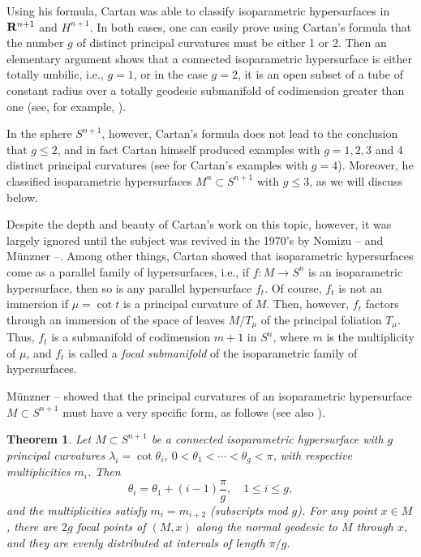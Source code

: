 \documentclass[12pt]{article}
\newtheorem{theorem}{Theorem}[section]
\begin{document}
Using his formula, Cartan was able to classify isoparametric hypersurfaces in ${\bf R}^{n+1}$ and $H^{n+1}$.  In both cases, one can easily prove using Cartan's formula that the number $g$ of distinct principal curvatures must be either 1 or 2.   Then an elementary argument shows that a connected isoparametric hypersurface is either totally umbilic, i.e., $g=1$, or in the case $g=2$,
it is an open subset of a tube of constant radius over a totally geodesic submanifold of codimension greater than one (see, for example, \cite[pp. 96--98]{CR8}).


In the sphere $S^{n+1}$, however, Cartan's formula does not lead to the conclusion that $g \leq 2$, and in fact Cartan
himself produced examples with $g = 1, 2, 3$ and 4 distinct
principal curvatures (see \cite{Car4} for Cartan's examples with $g=4$).  
Moreover, he classified isoparametric hypersurfaces $M^n \subset S^{n+1}$ with
$g \leq 3$, as we will discuss below.  

Despite the depth and beauty of Cartan's work on this topic, 
however, it was largely
ignored until the subject was revived in the 1970's by 
Nomizu \cite{Nom1}--\cite{Nom2} and M\"{u}nzner  \cite{Mu}--\cite{Mu2}.
Among other things, Cartan showed that isoparametric hypersurfaces
come as a parallel family of hypersurfaces, i.e., if
$f:M \rightarrow S^n$ is an isoparametric hypersurface, then so is 
any parallel hypersurface $f_t$.  Of course, $f_t$ is not an
immersion if $\mu = \cot t$ is a principal curvature of $M$.
Then, however, $f_t$ factors through an immersion of the
space of leaves $M/T_{\mu}$  of
the principal foliation $T_{\mu}$.  Thus,
$f_t$ is a submanifold of codimension $m+1$ in $S^n$, where
$m$ is the multiplicity of $\mu$, and $f_t$ is called a {\em focal submanifold} of the isoparametric family
of hypersurfaces.  


M\"{u}nzner \cite{Mu}--\cite{Mu2} showed that the principal curvatures of an
isoparametric hypersurface $M \subset S^{n+1}$ must have a very specific form, as follows
(see also \cite[p. 108]{CR8}).

\begin{theorem}
\label{thm:1-prin-curv-isop-hyp}
Let $M \subset S^{n+1}$ be a connected isoparametric hypersurface with $g$ principal curvatures
$\lambda_i = \cot \theta_i$, $0 < \theta_1 < \cdots < \theta_g < \pi$, with respective multiplicities $m_i$. Then
\begin{equation}
\label{eq:1-prin-curv-formula}
\theta_i = \theta_1 + (i-1) \frac{\pi}{g} , \quad 1 \leq i \leq g,
\end{equation}
and the multiplicities satisfy $m_i = m_{i+2}$ (subscripts mod $g$).  For any point $x \in M$, there
are $2g$ focal points of $(M,x)$ along the normal geodesic to $M$ through $x$, and they are evenly
distributed at intervals of length $\pi/g$.
\end{theorem}
\end{document}

